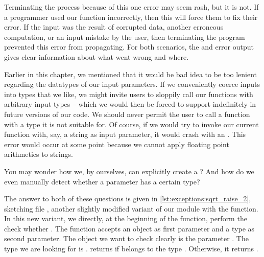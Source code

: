 Terminating the process because of this one error may seem rash, but it is not.
If a programmer used our  function incorrectly, then this will force them to fix their error.
If the input  was the result of corrupted data, another erroneous computation, or an input mistake by the user, then terminating the program prevented this error from propagating.
For both scenarios, the  and error output gives clear information about what went wrong and where.

%
%
%
%
%
%
%

Earlier in this chapter, we mentioned that it would be bad idea to be too lenient regarding the datatypes of our input parameters.
If we conveniently coerce inputs into types that we like, we might invite users to sloppily call our functions with arbitrary input types -- which we would then be forced to support indefinitely in future versions of our code.
We should never permit the user to call a function with a type it is not suitable for.
Of course, if we would try to invoke our current  function with, say, a string as input parameter, it would crash with an .
This error would occur at some point because we cannot apply floating point arithmetics to strings.

You may wonder how we, by ourselves, can explicitly create a ?
And how do we even manually detect whether a parameter has a certain type?

The answer to both of these questions is given in \cref{lst:exceptions:sqrt_raise_2}, sketching file , another slightly modified variant of our module with the  function.
In this new variant, we directly, at the beginning of the function, perform the check whether .
The function  accepts an object as first parameter and a type as second parameter.
The object we want to check clearly is the parameter .
The type we are looking for is .
 returns  if  belongs to the type .
Otherwise, it returns .

